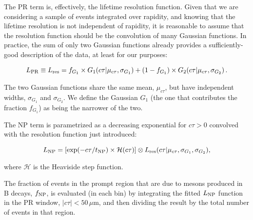 The PR term is, effectively, the lifetime resolution function.
Given that we are considering a sample of events integrated over rapidity,
and knowing that the lifetime resolution is not independent of rapidity,
it is reasonable to assume that the resolution function should be the convolution
of many Gaussian functions.
In practice, the sum of only two Gaussian functions already provides a 
sufficiently-good description of the data, at least for our purposes:

\begin{equation}
L_{\rm PR} \equiv L_{\rm res} = 
f_{G_1} \times G_{1}(c\tau|\mu_{c\tau}, \sigma_{G_1})
+(1-f_{G_1}) \times G_{2}(c\tau|\mu_{c\tau}, \sigma_{G_2}) \, .
\end{equation}


The two Gaussian functions share the same mean, $\mu_{c\tau}$, 
but have independent widths, $\sigma_{G_1}$ and $\sigma_{G_2}$. 
We define the Gaussian $G_1$ (the one that contributes the fraction $f_{G_1}$)
as being the narrower of the two.

The NP term is parametrized as a decreasing exponential for $c\tau > 0$
convolved with the resolution function just introduced:

\begin{equation}
L_{\rm NP} = \left[\exp(-c\tau/t_{\rm NP}) \times \mathcal{H}(c\tau)\right] 
\otimes L_{\rm res}(c\tau | \mu_{c\tau}, \sigma_{G_1}, \sigma_{G_2}),
\end{equation}

where $\mathcal{H}$ is the Heaviside step function.

The fraction of events in the prompt region 
that are due to \jpsi mesons produced in B decays, $f_{\rm NP}$, 
is evaluated (in each \pt bin) by integrating the fitted $L_{\rm NP}$ function
in the PR window, $|c\tau| < 50\,\mu$m, 
and then dividing the result by the total number of events in that region.

